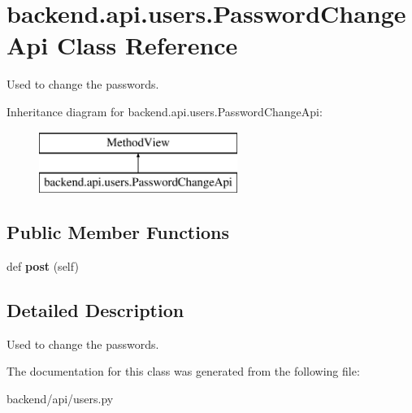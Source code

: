 \hypertarget{classbackend_1_1api_1_1users_1_1_password_change_api}{}\section{backend.\+api.\+users.\+Password\+Change\+Api Class Reference}
\label{classbackend_1_1api_1_1users_1_1_password_change_api}


Used to change the passwords.  


Inheritance diagram for backend.\+api.\+users.\+Password\+Change\+Api\+:\begin{figure}[H]
\begin{center}
\leavevmode
\includegraphics[height=2.000000cm]{classbackend_1_1api_1_1users_1_1_password_change_api}
\end{center}
\end{figure}
\subsection*{Public Member Functions}
\begin{DoxyCompactItemize}
\item 
\hypertarget{classbackend_1_1api_1_1users_1_1_password_change_api_a582a8baec5fde622ce58b1052c4c9a29}{}def {\bfseries post} (self)\label{classbackend_1_1api_1_1users_1_1_password_change_api_a582a8baec5fde622ce58b1052c4c9a29}

\end{DoxyCompactItemize}


\subsection{Detailed Description}
Used to change the passwords. 

The documentation for this class was generated from the following file\+:\begin{DoxyCompactItemize}
\item 
backend/api/users.\+py\end{DoxyCompactItemize}
